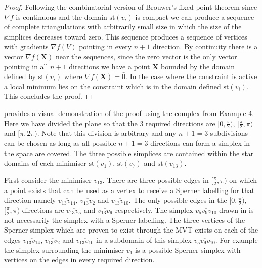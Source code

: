\begin{proof}
Following the combinatorial version of Brouwer's fixed point theorem \cite{Henle1979} since $\nabla f$ is continuous and the domain $\textrm{st}\left( v_i \right)$ is compact we can produce a sequence of complete triangulations with arbitrarily small size in which the size of the simplices decreases toward zero. This sequence produces a sequence of vertices with gradients $\nabla f(V)$ pointing in every $n+1$ direction. By continuity there is a vector $\nabla f (\mathbf{X})$ near the sequences, since the zero vector is the only vector pointing in all $n+1$ directions we have a point $\mathbf{X}$ bounded by the domain defined by $\textrm{st}\left( v_i \right)$ where $\nabla f (\mathbf{X}) = \bar{0}$.
In the case where the constraint is active a local minimum lies on the constraint which is in the domain defined $\textrm{st}\left( v_i \right)$. This concludes the proof.
\end{proof}

 provides a visual demonstration of the proof using the complex from Example 4. Here we have divided the plane so that the 3 required directions are $[0, \frac{\pi}{2})$, $[\frac{\pi}{2}, \pi)$ and $[\pi, 2 \pi)$. Note that this division is arbitrary and any $n + 1 = 3$ subdivisions can be chosen as long as all possible $n + 1 = 3$ directions can form a simplex in the space are covered. The three possible simplices are contained within the star domains of each minimiser $\textrm{st}\left(v_{1}\right)$, $\textrm{st}\left(v_{7}\right)$ and $\textrm{st}\left(v_{13}\right)$. 

First consider the minimiser $v_{13}$. There are three possible edges in $[\frac{\pi}{2}, \pi)$ on which a point exists that can be used as a vertex to receive a Sperner labelling for that direction namely $\overline{v_{13} v_{14}}$, $\overline{v_{13} v_{2}}$ and $\overline{v_{13}  v_{10}}$. The only possible edges in the $[0, \frac{\pi}{2})$, $[\frac{\pi}{2}, \pi)$ directions are $\overline{v_{13} v_{5}}$ and $\overline{v_{13} v_{9}}$ respectively. The simplex $\overline{v_{5} v_{9} v_{10}}$ drawn in  is not necessarily the simplex with a Sperner labelling. The three vertices of the Sperner simplex which are proven to exist through the MVT exists on each of the edges $\overline{v_{13} v_{14}}$, $\overline{v_{13} v_{2}}$ and $\overline{v_{13}  v_{10}}$ in a subdomain of this simplex $\overline{v_{5} v_{9} v_{10}}$. For example the simplex surrounding the minimiser $v_{1}$ is a possible Sperner simplex with vertices on the edges in every required direction.

